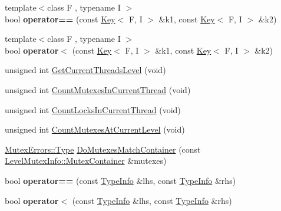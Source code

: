 \begin{DoxyCompactItemize}
\item 
\hypertarget{namespaceLoki_a34c2decb721c16ea73c8d05cf8f35ec5}{}{\footnotesize template$<$class F , typename I $>$ }\\bool {\bfseries operator==} (const \hyperlink{classLoki_1_1Key}{Key}$<$ F, I $>$ \&k1, const \hyperlink{classLoki_1_1Key}{Key}$<$ F, I $>$ \&k2)\label{namespaceLoki_a34c2decb721c16ea73c8d05cf8f35ec5}

\item 
\hypertarget{namespaceLoki_a9434ad3aacf46059746f820a4b32789a}{}{\footnotesize template$<$class F , typename I $>$ }\\bool {\bfseries operator$<$} (const \hyperlink{classLoki_1_1Key}{Key}$<$ F, I $>$ \&k1, const \hyperlink{classLoki_1_1Key}{Key}$<$ F, I $>$ \&k2)\label{namespaceLoki_a9434ad3aacf46059746f820a4b32789a}

\item 
unsigned int \hyperlink{namespaceLoki_a9548795d9cda6f227a1e1241ba577ca8}{Get\+Current\+Threads\+Level} (void)
\item 
unsigned int \hyperlink{namespaceLoki_aed0bb857431a808474a4b817d5c37f1c}{Count\+Mutexes\+In\+Current\+Thread} (void)
\item 
unsigned int \hyperlink{namespaceLoki_aae4c5edaad45b3657f39e8cdbae0f928}{Count\+Locks\+In\+Current\+Thread} (void)
\item 
unsigned int \hyperlink{namespaceLoki_a8cb767d3e7aaf2fe44b8f3b90218b876}{Count\+Mutexes\+At\+Current\+Level} (void)
\item 
\hyperlink{classLoki_1_1MutexErrors_acd0eb6065ca303083d2e0229d7bff590}{Mutex\+Errors\+::\+Type} \hyperlink{namespaceLoki_ad633ca81ae0befaf235ae63886368037}{Do\+Mutexes\+Match\+Container} (const \hyperlink{classLoki_1_1LevelMutexInfo_a76a0315d91234f5066c75660a9f27a7f}{Level\+Mutex\+Info\+::\+Mutex\+Container} \&mutexes)
\item 
\hypertarget{namespaceLoki_a7eeb3efc28b414524d16958f04d9d7d5}{}bool {\bfseries operator==} (const \hyperlink{classLoki_1_1TypeInfo}{Type\+Info} \&lhs, const \hyperlink{classLoki_1_1TypeInfo}{Type\+Info} \&rhs)\label{namespaceLoki_a7eeb3efc28b414524d16958f04d9d7d5}

\item 
\hypertarget{namespaceLoki_ae2725570e109b6bf56a2f9e4ad15628e}{}bool {\bfseries operator$<$} (const \hyperlink{classLoki_1_1TypeInfo}{Type\+Info} \&lhs, const \hyperlink{classLoki_1_1TypeInfo}{Type\+Info} \&rhs)\label{namespaceLoki_ae2725570e109b6bf56a2f9e4ad15628e}


\end{DoxyCompactItemize}
